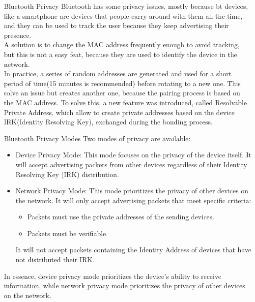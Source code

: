 \begin{section}{Bluetooth Privacy}
  Bluetooth has some privacy issues, mostly because bt devices, like a smartphone are devices that
  people carry around with them all the time, and they can be used to track the user because they
  keep advertising their presence.\\
  A solution is to change the MAC address frequently enough to avoid tracking, but this is not
  a easy feat, because they are used to identify the device in the network.\\
  In practice, a series of random addresses are generated and used for a short period of time(15
  minutes is recommended) before rotating to a new one. This solve an issue but creates another one,
  because the pairing process is based on the MAC address. To solve this, a new feature was
  introduced, called Resolvable Private Address, which allow to create private addresses based on
  the device IRK(Identity Resolving Key), exchanged during the bonding process.

  \begin{subsection}{Bluetooth Privacy Modes}
    Two modes of privacy are available:
    \begin{itemize}
      \item Device Privacy Mode: This mode focuses on the privacy of the device itself. It will
        accept advertising packets from other devices regardless of their Identity Resolving Key
        (IRK) distribution.
      \item Network Privacy Mode: This mode prioritizes the privacy of other devices on the network.
        It will only accept advertising packets that meet specific criteria:
        \begin{itemize}
          \item Packets must use the private addresses of the sending devices.
          \item Packets must be verifiable.
        \end{itemize}
        It will not accept packets containing the Identity Address of devices that have not distributed their IRK.
    \end{itemize}
    In essence, device privacy mode prioritizes the device's ability to receive information, while network privacy mode prioritizes the privacy of other devices on the network.
  \end{subsection}


\end{section}
